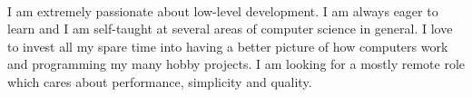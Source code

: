 \paragraph*{}
I am extremely passionate about low-level development. I am always eager to learn and I am self-taught at several areas of computer science in general. I love to invest all my spare time into having a better picture of how computers work and programming my many hobby projects. I am looking for a mostly remote role which cares about performance, simplicity and quality.
